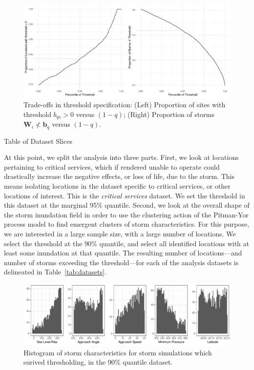 \begin{figure}[ht]
    \centering
    \caption{Trade-offs in threshold specification:
    (Left) Proportion of sites with threshold $b_{qs} > 0$ versus $(1 - q)$; 
    (Right) Proportion of storms $\bm{W}_i \not< \bm{b}_q$ versus $(1-q)$.
    \label{fig:thresholdselection}}
    \includegraphics[width=0.9\linewidth]{plots/explore_threshold}
\end{figure}

\begin{table}
    \centering
    \caption{Table of Dataset Slices\label{tab:datasets}}    
\end{table}

At this point, we split the analysis into three parts.  First, we look at locations
    pertaining to critical services, which if rendered unable to operate could
    drastically increase the negative effects, or loss of life, due to the storm.
    This means isolating locations in the dataset specific to critical services, or
    other locations of interest.  This is the \emph{critical services} dataset.  We
    set the threshold in this dataset at the marginal 95\% quantile.
    Second, we look at the overall shape of the storm inundation field in order to
    use the clustering action of the Pitman-Yor process model to find emergent clusters
    of storm characteristics.  For this purpose, we are interested in a large sample
    size, with a large number of locations.  We select the threshold at the 90\% quantile, 
    and select all identified locations with at least some inundation at that quantile.
    The resulting number of locations---and number of storms exceeding the threshold---for 
    each of the analysis datasets is delineated in Table~\ref{tab:datasets}.

\begin{figure}[b]
    \centering 
    \caption{Histogram of storm characteristics for storm simulations 
        which surived thresholding, in the 90\% quantile dataset.\label{fig:thetahistogram}}
    \includegraphics[width=0.9\linewidth]{plots/threshold_histogram}
\end{figure}

